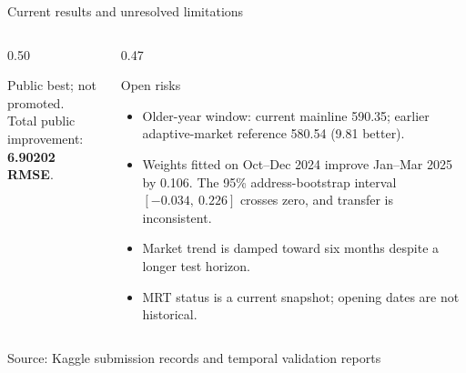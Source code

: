 \documentclass[xcolor=dvipsnames,aspectratio=43]{beamer}
\newcommand{\source}[1]{%
  \vfill\par\begingroup\raggedright\tiny\color{gray}Source: #1\par\endgroup
}
\begin{document}
\begin{frame}{Current results and unresolved limitations}
\small
\begin{columns}[T,totalwidth=\textwidth]
  \begin{column}{0.50\textwidth}
    \footnotesize
    \vspace{0.25cm}

    \small *Public best; not promoted.\\[1mm]
    Total public improvement: \textbf{6.90202 RMSE}.
  \end{column}
  \begin{column}{0.47\textwidth}
    \begin{alertblock}{Open risks}
      \footnotesize
      \begin{itemize}
        \item Older-year window: current mainline 590.35; earlier adaptive-market reference 580.54 (9.81 better).
        \item Weights fitted on Oct--Dec 2024 improve Jan--Mar 2025 by 0.106. The 95\% address-bootstrap interval $[-0.034,\ 0.226]$ crosses zero, and transfer is inconsistent.
        \item Market trend is damped toward six months despite a longer test horizon.
        \item MRT status is a current snapshot; opening dates are not historical.
      \end{itemize}
    \end{alertblock}
  \end{column}
\end{columns}
\source{Kaggle submission records and temporal validation reports}
\end{frame}
\end{document}
